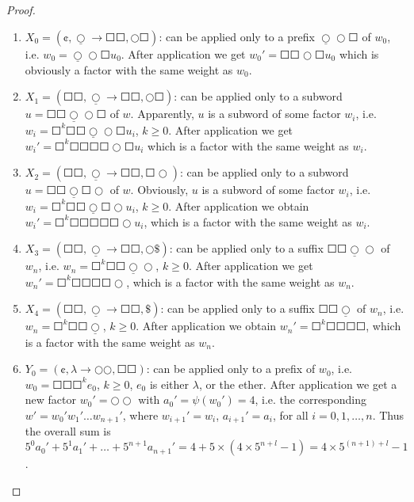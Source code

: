 \begin{proof}
\begin{enumerate}
\item $X_0 = (\cent, \underline{\Circle} \to \Square \Square, \Circle \Square)$: can be applied only to a prefix $\underline{\Circle} \Circle \Square$ of $w_0$, i.e. $w_0 = \underline{\Circle} \Circle \Square u_0$. After application we get $w_0' = \Square \Square \Circle \Square u_0$ which is obviously a factor with the same weight as $w_0$.
\item $X_1 = (\Square \Square, \underline{\Circle} \to \Square \Square, \Circle \Square)$: can be applied only to a subword $u = \Square \Square \underline{\Circle} \Circle \Square$ of $w$. Apparently, $u$ is a subword of some factor $w_i$, i.e. $w_i = \Square^k \Square \Square \underline{\Circle} \Circle \Square u_i$, $k \ge 0$. After application we get $w_i' = \Square^k \Square \Square \Square \Square \Circle \Square u_i$ which is a factor with the same weight as $w_i$.
\item $X_2 = (\Square \Square, \underline{\Circle} \to \Square \Square, \Square \Circle)$: can be applied only to a subword $u = \Square \Square \underline{\Circle} \Square \Circle$ of $w$. Obviously, $u$ is a subword of some factor $w_i$, i.e. $w_i = \Square^k \Square \Square \underline{\Circle} \Square \Circle u_i$, $k \ge 0$. After application we obtain $w_i' = \Square^k \Square \Square \Square \Square \Square \Circle u_i$, which is a factor with the same weight as $w_i$.
\item $X_3 = (\Square \Square, \underline{\Circle} \to \Square \Square, \Circle \$)$: can be applied only to a suffix $\Square \Square \underline{\Circle} \Circle$ of $w_n$, i.e. $w_n = \Square^k \Square \Square \underline{\Circle} \Circle$, $k \ge 0$. After application we get $w_n' = \Square^k \Square \Square \Square \Square \Circle$, which is a factor with the same weight as $w_n$.
\item $X_4 = (\Square \Square, \underline{\Circle} \to \Square \Square, \$)$: can be applied only to a suffix $\Square \Square \underline{\Circle}$ of $w_n$, i.e. $w_n = \Square^k \Square \Square \underline{\Circle}$, $k \ge 0$. After application we obtain $w_n' = \Square^k \Square \Square \Square \Square$, which is a factor with the same weight as $w_n$.
\item $Y_0 = (\cent, \lambda \to \Circle \Circle, \Square \Square)$: can be applied only to a prefix of $w_0$, i.e. $w_0 = \Square \Square \Square^k e_0$, $k \ge 0$, $e_0$ is either $\lambda$, or the ether. After application we get a new factor $w_0' = \Circle \Circle$ with $a_0' = \psi(w_0') = 4$, i.e. the corresponding $w' = w_0' w_1' \ldots w_{n+1}'$, where $w_{i+1}' = w_i$, $a_{i+1}' = a_i$, for all $i = 0, 1, \ldots, n$. Thus the overall sum is $5^0 a_0' + 5^1 a_1' + \ldots + 5^{n+1} a_{n+1}' = 4 + 5 \times (4 \times 5^{n+l} - 1) = 4 \times 5^{(n+1)+l} - 1$.

\end{enumerate}
\end{proof}
